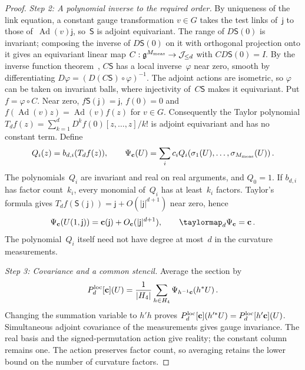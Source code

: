 \begin{proof}
\emph{Step 2: A polynomial inverse to the required order.} By uniqueness of the link equation, a constant gauge transformation $v\in G$ takes the test links of~$\mathsf j$ to those of~$\operatorname{Ad}(v)\mathsf j$, so~$\mathsf S$ is adjoint equivariant. The range of $D\mathsf S(0)$ is invariant; composing the inverse of $D\mathsf S(0)$ on it with orthogonal projection onto it gives an equivariant linear map $C:\mathfrak{g}^{M_{\rm meas}}\to\mathcal J_{\le d}$ with $CD\mathsf S(0)=I$. By the inverse function theorem~\cite[Theorem~9.24]{Rudin1976}, $C\mathsf S$ has a local inverse~$\varphi$ near zero, smooth by differentiating $D\varphi=(D(C\mathsf S)\circ\varphi)^{-1}$. The adjoint actions are isometric, so $\varphi$ can be taken on invariant balls, where injectivity of~$C\mathsf S$ makes it equivariant. Put $f=\varphi\circ C$. Near zero, $f\mathsf S(\mathsf j)=\mathsf j$, $f(0)=0$ and $f(\operatorname{Ad}(v)z)=\operatorname{Ad}(v)f(z)$ for $v\in G$. Consequently the Taylor polynomial $T_df(z)=\sum_{k=1}^{d}D^kf(0)[z,\ldots,z]/k!$ is adjoint equivariant and has no constant term. Define
\begin{equation*}
Q_i(z)=b_{d,i}(T_df(z)),\qquad
\Psi_{\mathbf c}(U)=\sum_i c_iQ_i(\sigma_1(U),\ldots,\sigma_{M_{\rm meas}}(U))\,.
\end{equation*}
The polynomials~$Q_i$ are invariant and real on real arguments, and $Q_0=1$. If $b_{d,i}$ has factor count~$k_i$, every monomial of~$Q_i$ has at least~$k_i$ factors. Taylor's formula gives $T_df(\mathsf S(\mathsf j))=\mathsf j+O(|\mathsf j|^{d+1})$ near zero, hence
\begin{equation*}
\Psi_{\mathbf c}(U(1,\mathsf j))=\mathbf c(\mathsf j)+O_{\mathbf c}(|\mathsf j|^{d+1}),\qquad
\taylormap_{d}\Psi_{\mathbf c}=\mathbf c\,.
\end{equation*}
The polynomial~$Q_i$ itself need not have degree at most~$d$ in the curvature measurements.

\emph{Step 3: Covariance and a common stencil.} Average the section by
\begin{equation}\label{eq:A-average}
P_{d}^{\mathrm{loc}}[\mathbf c](U)=\frac1{|H_4|}
\sum_{h\in H_4}\Psi_{h^{-1}\mathbf c}(h^*U)\,.
\end{equation}
Changing the summation variable to $h'h$ proves $P_{d}^{\mathrm{loc}}[\mathbf c](h'^*U)=P_{d}^{\mathrm{loc}}[h'\mathbf c](U)$. Simultaneous adjoint covariance of the measurements gives gauge invariance. The real basis and the signed-permutation action give reality; the constant column remains one. The action preserves factor count, so averaging retains the lower bound on the number of curvature factors.


\end{proof}
